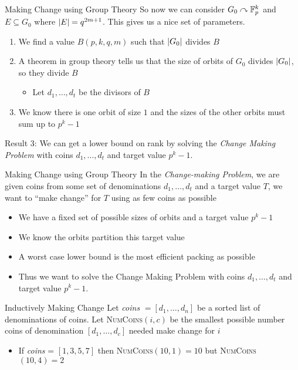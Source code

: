 \documentclass[aspectratio=169]{beamer}
\begin{document}
\begin{frame}{Making Change using Group Theory}
    So now we can consider $G_0 \curvearrowright \mathbb{F}_p^k$ and $E \subseteq G_0$ where $\abs{E} = q^{2m + 1}$.
    This gives us a nice set of parameters.

    \begin{enumerate}
        \item We find a value $B(p, k, q, m)$ such that $\abs{G_0}$ divides $B$ \pause
        \item A theorem in group theory tells us that the size of orbits of $G_0$ divides $\abs{G_0}$, so they divide $B$
        \begin{itemize}
            \item Let $d_1, \ldots, d_t$ be the divisors of $B$
        \end{itemize}
        \item We know there is one orbit of size $1$ and the sizes of the other orbits must sum up to $p^k - 1$ \pause
    \end{enumerate}

    \textcolor{sigma@mainblue}{Result 3: } We can get a lower bound on rank by solving the \emph{Change Making Problem} with coins $d_1, \ldots, d_t$ and target value $p^k - 1$.    
\end{frame}

\begin{frame}{Making Change using Group Theory}
    In the \emph{Change-making Problem}, we are given coins from some set of denominations $d_1, \ldots, d_t$ and a target value $T$, we want to ``make change'' for $T$ using as few coins as possible

    \vspace{20pt}
    
    \begin{itemize}
        \item We have a fixed set of possible sizes of orbits and a target value $p^k - 1$ \pause
        \item We know the orbits partition this target value \pause
        \item A worst case lower bound is the most efficient packing as possible
        \item Thus we want to solve the Change Making Problem with coins $d_1, \ldots, d_t$ and target value $p^k - 1$.    
    \end{itemize}
\end{frame}

\begin{frame}{Inductively Making Change}
    Let \emph{coins} $= [d_1, \ldots, d_n]$ be a sorted list of denominations of coins.
    Let \textsc{NumCoins}$(i, c)$ be the smallest possible number coins of denomination $[d_1, \ldots, d_c]$ needed make change for $i$
    \begin{itemize}
        \item If \emph{coins} = $[1, 3, 5, 7]$ then \textsc{NumCoins}$(10, 1) = 10$ but \textsc{NumCoins}$(10, 4) = 2$
    \end{itemize}
\end{frame}
\end{document}
